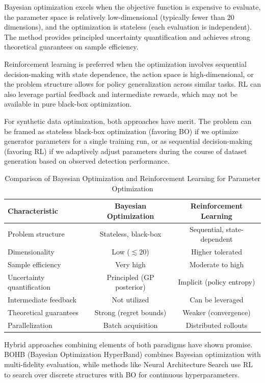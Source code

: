 Bayesian optimization excels when the objective function is expensive to evaluate, the parameter space is relatively low-dimensional (typically fewer than 20 dimensions), and the optimization is stateless (each evaluation is independent). The method provides principled uncertainty quantification and achieves strong theoretical guarantees on sample efficiency.

Reinforcement learning is preferred when the optimization involves sequential decision-making with state dependence, the action space is high-dimensional, or the problem structure allows for policy generalization across similar tasks. RL can also leverage partial feedback and intermediate rewards, which may not be available in pure black-box optimization.

For synthetic data optimization, both approaches have merit. The problem can be framed as stateless black-box optimization (favoring BO) if we optimize generator parameters for a single training run, or as sequential decision-making (favoring RL) if we adaptively adjust parameters during the course of dataset generation based on observed detection performance.

\begin{table}[htbp]
\centering
\caption{Comparison of Bayesian Optimization and Reinforcement Learning for Parameter Optimization}
\label{tab:bo_vs_rl}
\begin{tabular}{lcc}
\toprule
\textbf{Characteristic} & \textbf{Bayesian Optimization} & \textbf{Reinforcement Learning} \\
\midrule
Problem structure & Stateless, black-box & Sequential, state-dependent \\
Dimensionality & Low ($\lesssim 20$) & Higher tolerated \\
Sample efficiency & Very high & Moderate to high \\
Uncertainty quantification & Principled (GP posterior) & Implicit (policy entropy) \\
Intermediate feedback & Not utilized & Can be leveraged \\
Theoretical guarantees & Strong (regret bounds) & Weaker (convergence) \\
Parallelization & Batch acquisition & Distributed rollouts \\
\bottomrule
\end{tabular}
\end{table}

Hybrid approaches combining elements of both paradigms have shown promise. BOHB (Bayesian Optimization HyperBand) combines Bayesian optimization with multi-fidelity evaluation, while methods like Neural Architecture Search use RL to search over discrete structures with BO for continuous hyperparameters.

